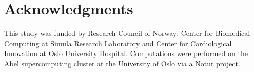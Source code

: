 \section*{Acknowledgments}
This study was funded by Research Council of Norway: Center for
Biomedical Computing at Simula Research Laboratory and Center for
Cardiological Innovation at Oslo University Hospital.
Computations were performed on the Abel supercomputing cluster at the 
University of Oslo via a Notur project.

\newpage



